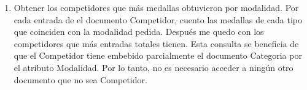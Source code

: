 \begin{enumerate}
\item Obtener los competidores que más medallas obtuvieron por modalidad. Por cada entrada de el documento Competidor,
cuento las medallas de cada tipo que coinciden con la modalidad pedida. Después me quedo con los competidores que más entradas
totales tienen. Esta consulta se beneficia de que el Competidor tiene embebido parcialmente el documento Categoria por el
atributo Modalidad. Por lo tanto, no es necesario acceder a ningún otro documento que no sea Competidor.

\end{enumerate}
